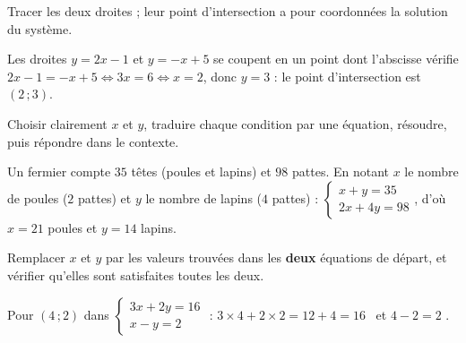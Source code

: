 Tracer les deux droites ; leur point d'intersection a pour coordonnées la solution du
système.
\begin{exemple}
Les droites $y=2x-1$ et $y=-x+5$ se coupent en un point dont l'abscisse vérifie
$2x-1=-x+5\iff3x=6\iff x=2$, donc $y=3$ : le point d'intersection est $(2\,;3)$.
\end{exemple}

Choisir clairement $x$ et $y$, traduire chaque condition par une équation, résoudre, puis
répondre dans le contexte.
\begin{exemple}
Un fermier compte $35$ têtes (poules et lapins) et $98$ pattes. En notant $x$ le nombre de
poules ($2$ pattes) et $y$ le nombre de lapins ($4$ pattes) :
$\left\{\begin{array}{l}x+y=35\\2x+4y=98\end{array}\right.$, d'où $x=21$ poules et $y=14$
lapins.
\end{exemple}

Remplacer $x$ et $y$ par les valeurs trouvées dans les \textbf{deux} équations de départ, et
vérifier qu'elles sont satisfaites toutes les deux.
\begin{exemple}
Pour $(4\,;2)$ dans $\left\{\begin{array}{l}3x+2y=16\\x-y=2\end{array}\right.$ :
$3\times4+2\times2=12+4=16$ \checkmark\ et $4-2=2$ \checkmark.
\end{exemple}


